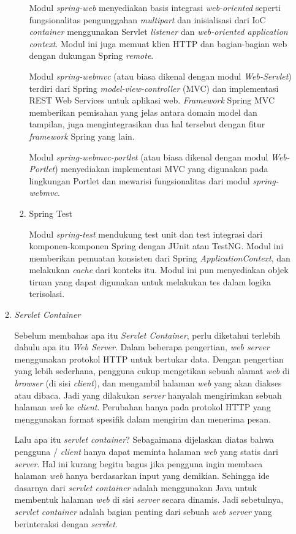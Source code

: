 \documentclass[pdftex,12pt, oneside]{article}
\begin{document}
\begin{enumerate}
\begin{enumerate}
\begin{enumerate}[1)]
    Modul \textit{spring-web} menyediakan basis integrasi \textit{web-oriented} seperti fungsionalitas pengunggahan \textit{multipart} dan inisialisasi dari IoC \textit{container} menggunakan Servlet \textit{listener} dan \textit{web-oriented application context}. Modul ini juga memuat klien HTTP dan bagian-bagian web dengan dukungan Spring \textit{remote}.
    
    Modul \textit{spring-webmvc} (atau biasa dikenal dengan modul \textit{Web-Servlet}) terdiri dari Spring \textit{model-view-controller} (MVC) dan implementasi REST Web Services untuk aplikasi web. \textit{Framework} Spring MVC memberikan pemisahan yang jelas antara domain model dan tampilan, juga mengintegrasikan dua hal tersebut dengan fitur \textit{framework} Spring yang lain.
    
    Modul \textit{spring-webmvc-portlet} (atau biasa dikenal dengan modul \textit{Web-Portlet}) menyediakan implementasi MVC yang digunakan pada lingkungan Portlet dan mewarisi fungsionalitas dari modul \textit{spring-webmvc}.
    
    
    \item Spring Test
    
    Modul \textit{spring-test} mendukung test unit dan test integrasi dari komponen-komponen Spring dengan JUnit atau TestNG. Modul ini memberikan pemuatan konsisten dari Spring \textit{ApplicationContext}, dan melakukan \textit{cache} dari konteks itu. Modul ini pun menyediakan objek tiruan yang dapat digunakan untuk melakukan tes dalam logika terisolasi.
    
    
  \end{enumerate}
  
  \item \textit{Servlet Container}
  
  Sebelum membahas apa itu \textit{Servlet Container}, perlu diketahui terlebih dahulu apa itu \textit{Web Server}. Dalam beberapa pengertian, \textit{web server} menggunakan protokol HTTP untuk bertukar data. Dengan pengertian yang lebih sederhana, pengguna cukup mengetikan sebuah alamat \textit{web} di \textit{browser} (di sisi \textit{client}), dan mengambil halaman \textit{web} yang akan diakses atau dibaca. Jadi yang dilakukan \textit{server} hanyalah mengirimkan sebuah halaman \textit{web} ke \textit{client}. Perubahan hanya pada protokol HTTP yang menggunakan format spesifik dalam mengirim dan menerima pesan.
  
  Lalu apa itu \textit{servlet container}? Sebagaimana dijelaskan diatas bahwa pengguna / \textit{client} hanya dapat meminta halaman \textit{web} yang statis dari \textit{server}. Hal ini kurang begitu bagus jika pengguna ingin membaca halaman \textit{web} hanya berdasarkan input yang demikian. Sehingga ide dasarnya dari \textit{servlet container} adalah menggunakan Java untuk membentuk halaman \textit{web} di sisi \textit{server} secara dinamis. Jadi sebetulnya, \textit{servlet container} adalah bagian penting dari sebuah \textit{web server} yang berinteraksi dengan \textit{servlet}.
  

\end{enumerate}
\end{enumerate}
\end{document}
